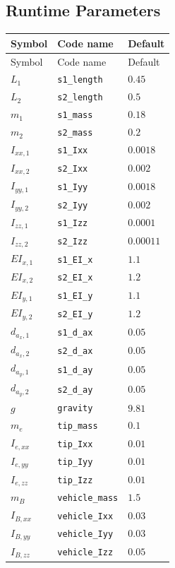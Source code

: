 \documentclass[11pt]{article}
\begin{document}
\subsection{Runtime Parameters}
\begin{longtable}{lll}
\hline
Symbol & Code name & Default \\
\hline
\endfirsthead
\hline Symbol & Code name & Default \\
\hline
\endhead
$L_{1}$ & \texttt{s1\_length} & $0.45$ \\
$L_{2}$ & \texttt{s2\_length} & $0.5$ \\
$m_{1}$ & \texttt{s1\_mass} & $0.18$ \\
$m_{2}$ & \texttt{s2\_mass} & $0.2$ \\
$I_{xx,1}$ & \texttt{s1\_Ixx} & $0.0018$ \\
$I_{xx,2}$ & \texttt{s2\_Ixx} & $0.002$ \\
$I_{yy,1}$ & \texttt{s1\_Iyy} & $0.0018$ \\
$I_{yy,2}$ & \texttt{s2\_Iyy} & $0.002$ \\
$I_{zz,1}$ & \texttt{s1\_Izz} & $0.0001$ \\
$I_{zz,2}$ & \texttt{s2\_Izz} & $0.00011$ \\
$EI_{x,1}$ & \texttt{s1\_EI\_x} & $1.1$ \\
$EI_{x,2}$ & \texttt{s2\_EI\_x} & $1.2$ \\
$EI_{y,1}$ & \texttt{s1\_EI\_y} & $1.1$ \\
$EI_{y,2}$ & \texttt{s2\_EI\_y} & $1.2$ \\
$d_{a_x,1}$ & \texttt{s1\_d\_ax} & $0.05$ \\
$d_{a_x,2}$ & \texttt{s2\_d\_ax} & $0.05$ \\
$d_{a_y,1}$ & \texttt{s1\_d\_ay} & $0.05$ \\
$d_{a_y,2}$ & \texttt{s2\_d\_ay} & $0.05$ \\
$g$ & \texttt{gravity} & $9.81$ \\
$m_e$ & \texttt{tip\_mass} & $0.1$ \\
$I_{e,xx}$ & \texttt{tip\_Ixx} & $0.01$ \\
$I_{e,yy}$ & \texttt{tip\_Iyy} & $0.01$ \\
$I_{e,zz}$ & \texttt{tip\_Izz} & $0.01$ \\
$m_B$ & \texttt{vehicle\_mass} & $1.5$ \\
$I_{B,xx}$ & \texttt{vehicle\_Ixx} & $0.03$ \\
$I_{B,yy}$ & \texttt{vehicle\_Iyy} & $0.03$ \\
$I_{B,zz}$ & \texttt{vehicle\_Izz} & $0.05$ \\
\hline
\end{longtable}
\end{document}
